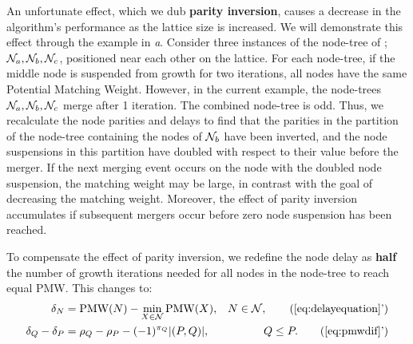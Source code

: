 An unfortunate effect, which we dub \textbf{parity inversion}, causes a decrease in the algorithm's performance as the lattice size is increased. We will demonstrate this effect through the example in \emph{a}. Consider three instances of the node-tree of ; $\mathcal{N}_a, \mathcal{N}_b, \mathcal{N}_c$, positioned near each other on the lattice. For each node-tree, if the middle node is suspended from growth for two iterations, all nodes have the same Potential Matching Weight. However, in the current example, the node-trees $\mathcal{N}_a, \mathcal{N}_b, \mathcal{N}_c$ merge after 1 iteration. The combined node-tree is odd. Thus, we recalculate the node parities and delays to find that the parities in the partition of the node-tree containing the nodes of $\mathcal{N}_b$ have been inverted, and the node suspensions in this partition have doubled with respect to their value before the merger. If the next merging event occurs on the node with the doubled node suspension, the matching weight may be large, in contrast with the goal of decreasing the matching weight. Moreover, the effect of parity inversion accumulates if subsequent mergers occur before zero node suspension has been reached. %

To compensate the effect of parity inversion, we redefine the node delay as \textbf{half} the number of growth iterations needed for all nodes in the node-tree to reach equal PMW. This changes  to:
\begin{align}
    \delta_N &= \text{PMW}(N) - \min_{X\in\nset}{\text{PMW}(X)}, & N \in \nset, \tag{\ref{eq:delayequation}'}  \\
    \delta_Q - \delta_P &= \rho_Q-\rho_P - (-1)^{\pi_Q}\abs{(P,Q)}, & Q\leq P. \tag{\ref{eq:pmwdif}'}\label{eq:pmwdifnew}
\end{align}

